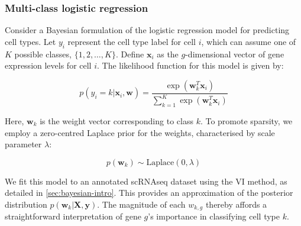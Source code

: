 
\subsubsection*{Multi-class logistic regression}

Consider a Bayesian formulation of the logistic regression model for predicting cell types. Let $y_i$ represent the cell type label for cell $i$, which can assume one of $K$ possible classes, $\{1, 2, \ldots, K\}$. Define $\mathbf{x}_i$ as the $g$-dimensional vector of gene expression levels for cell $i$. The likelihood function for this model is given by:

\begin{equation}
    \label{eq:logistic-regression-likelihood}
    p(y_i = k | \mathbf{x}_i, \mathbf{w}) = \frac{\exp(\mathbf{w}_{k}^T \mathbf{x}_i)}{\sum_{k=1}^{K} \exp(\mathbf{w}_{k}^T \mathbf{x}_i)}
\end{equation}

Here, $\mathbf{w}_k$ is the weight vector corresponding to class $k$. To promote sparsity, we employ a zero-centred Laplace prior for the weights, characterised by scale parameter $\lambda$:

\begin{equation}
    \label{eq:logistic-regression-prior}
    p(\mathbf{w}_k) \sim \text{Laplace}(0, \lambda)
\end{equation}

We fit this model to an annotated \ac{scRNAseq} dataset using the \ac{VI} method, as detailed in \cref{sec:bayesian-intro}. This provides an approximation of the posterior distribution $p(\mathbf{w}_k | \mathbf{X}, \mathbf{y})$. The magnitude of each $w_{k,g}$ thereby affords a straightforward interpretation of gene $g$'s importance in classifying cell type $k$.

